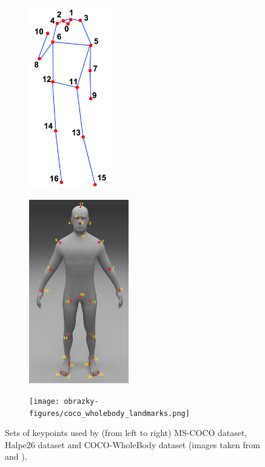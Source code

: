 \begin{figure}[htbp]
    \centering
    \begin{subfigure}[b]{0.2\textwidth}
        \centering

        \includegraphics[height=8cm]{obrazky-figures/coco_landmarks.png}
        \label{fig:image1}
    \end{subfigure}
    \hfill
    \begin{subfigure}[b]{0.25\textwidth}
        \centering

        \includegraphics[height=8cm]{obrazky-figures/halpe_landmarks.jpg}
        \label{fig:image2}
    \end{subfigure}
    \hfill
    \begin{subfigure}[b]{0.5\textwidth}
        \centering

        \texttt{[image: obrazky-figures/coco\_wholebody\_landmarks.png]}
        \label{fig:image3}
    \end{subfigure}

    \caption{Sets of keypoints used by (from left to right) MS-COCO dataset, Halpe26 dataset and COCO-WholeBody dataset (images taken from \cite{coco} and \cite{halpe}).}
    \label{fig:subfigures}
\end{figure}



